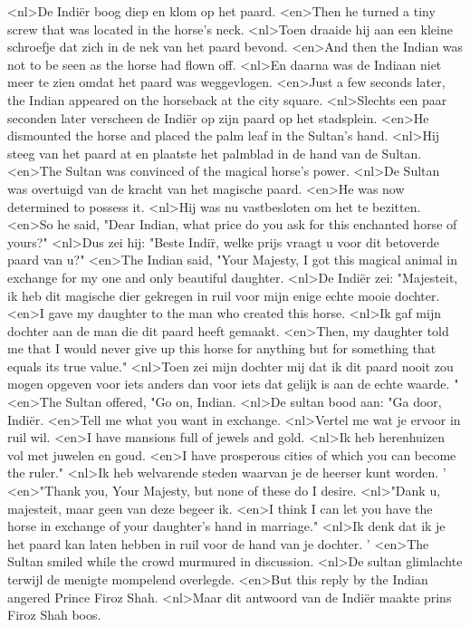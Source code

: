 <nl>De Indi\"er boog diep en klom op het paard.
<en>Then he turned a tiny screw that was located in the horse's neck.
<nl>Toen draaide hij aan een kleine schroefje dat zich in de nek van het paard bevond.
<en>And then the Indian was not to be seen as the horse had flown off.
<nl>En daarna was de Indiaan niet meer te zien omdat het paard was weggevlogen.
<en>Just a few seconds later, the Indian appeared on the horseback at the city square.
<nl>Slechts een paar seconden later verscheen de Indi\"er op zijn  paard op het stadsplein.
<en>He dismounted the horse and placed the palm leaf in the Sultan's hand.
<nl>Hij steeg van het paard at en plaatste het palmblad in de hand van de Sultan.
<en>The Sultan was convinced of the magical horse's power.
<nl>De Sultan was overtuigd van de kracht van het magische paard.
<en>He was now determined to possess it.
<nl>Hij was nu vastbesloten om het te bezitten.
<en>So he said, "Dear Indian, what price do you ask for this enchanted horse of yours?"
<nl>Dus zei hij: "Beste Indi\"r, welke prijs vraagt u voor dit betoverde paard van u?"
<en>The Indian said, "Your Majesty, I got this magical animal in exchange for my one and only beautiful daughter.
<nl>De Indi\"er zei: "Majesteit, ik heb dit magische dier gekregen  in ruil voor mijn enige echte  mooie dochter.
<en>I gave my daughter to the man who created this horse.
<nl>Ik gaf mijn dochter aan de man die dit paard heeft gemaakt.
<en>Then, my daughter told me that I would never give up this horse for anything but for something that equals its true value."
<nl>Toen zei mijn dochter mij dat ik dit paard nooit zou mogen opgeven voor iets anders dan voor iets dat gelijk is aan de echte waarde. "
<en>The Sultan offered, "Go on, Indian.
<nl>De sultan bood aan: "Ga door, Indi\"er.
<en>Tell me what you want in exchange.
<nl>Vertel me wat je ervoor in ruil wil.
<en>I have mansions full of jewels and gold.
<nl>Ik heb herenhuizen vol met juwelen en goud.
<en>I have prosperous cities of which you can become the ruler."
<nl>Ik heb welvarende steden waarvan je de heerser kunt worden. '
<en>"Thank you, Your Majesty, but none of these do I desire.
<nl>"Dank u, majesteit, maar geen van deze begeer ik.
<en>I think I can let you have the horse in exchange of your daughter's hand in marriage."
<nl>Ik denk dat ik je het paard kan laten hebben in ruil voor de hand van je dochter. '
<en>The Sultan smiled while the crowd murmured in discussion.
<nl>De sultan glimlachte terwijl de menigte  mompelend overlegde.
<en>But this reply by the Indian angered Prince Firoz Shah.
<nl>Maar dit antwoord van de Indi\"er maakte prins Firoz Shah boos.
